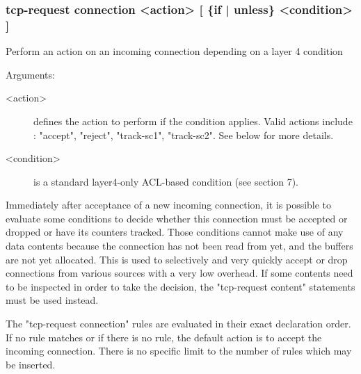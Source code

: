 \subsubsection[tcp-request connection]{tcp-request connection <action> [ \{if | unless\} <condition> ]}


  Perform an action on an incoming connection depending on a layer 4 condition
  


  Arguments:
  \begin{description}
  \item[<action>] defines the action to perform if the condition applies. Valid
                actions include : "accept", "reject", "track-sc1", "track-sc2".
                See below for more details.

  \item[<condition>] is a standard layer4-only ACL-based condition (see section 7).
  \end{description}

  Immediately after acceptance of a new incoming connection, it is possible to
  evaluate some conditions to decide whether this connection must be accepted
  or dropped or have its counters tracked. Those conditions cannot make use of
  any data contents because the connection has not been read from yet, and the
  buffers are not yet allocated. This is used to selectively and very quickly
  accept or drop connections from various sources with a very low overhead. If
  some contents need to be inspected in order to take the decision, the
  "tcp-request content" statements must be used instead.

  The "tcp-request connection" rules are evaluated in their exact declaration
  order. If no rule matches or if there is no rule, the default action is to
  accept the incoming connection. There is no specific limit to the number of
  rules which may be inserted.


